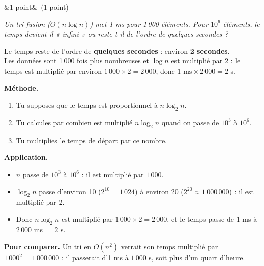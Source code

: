 \documentclass[11pt, a4paper]{exam}
\newcommand{\Q}[3]{\par\needspace{5\baselineskip}\bigskip\noindent{\large\bfseries Question #1}\ifx&#2&\else\ \textnormal{(#2)}\fi\par\nopagebreak\smallskip\noindent\textit{#3}\par\nopagebreak\smallskip}
\newcommand{\methode}{\par\noindent\textbf{Méthode.}\ }
\newcommand{\application}{\par\noindent\textbf{Application.}\ }
\begin{document}
\Q{1 (b)}{1 point}{Un tri fusion ($O(n \log n)$) met 1 ms pour 1\,000 éléments. Pour $10^6$ éléments, le temps devient-il « infini » ou reste-t-il de l'ordre de quelques secondes ?}
\begin{reponse}
Le temps reste de l'ordre de \textbf{quelques secondes} : environ \textbf{2 secondes}. \\
Les données sont 1\,000 fois plus nombreuses et $\log n$ est multiplié par 2 : le temps est multiplié par environ $1\,000 \times 2 = 2\,000$, donc $1 \text{ ms} \times 2\,000 = 2$ s.
\end{reponse}
\methode
\begin{enumerate}
\item Tu supposes que le temps est proportionnel à $n \log_2 n$.
\item Tu calcules par combien est multiplié $n \log_2 n$ quand on passe de $10^3$ à $10^6$.
\item Tu multiplies le temps de départ par ce nombre.
\end{enumerate}
\application
\begin{itemize}
\item $n$ passe de $10^3$ à $10^6$ : il est multiplié par $1\,000$.
\item $\log_2 n$ passe d'environ 10 ($2^{10} = 1\,024$) à environ 20 ($2^{20} \approx 1\,000\,000$) : il est multiplié par 2.
\item Donc $n \log_2 n$ est multiplié par $1\,000 \times 2 = 2\,000$, et le temps passe de 1 ms à $2\,000$ ms $= 2$ s.
\end{itemize}
\textbf{Pour comparer.} Un tri en $O(n^2)$ verrait son temps multiplié par $1\,000^2 = 1\,000\,000$ : il passerait d'1 ms à $1\,000$ s, soit plus d'un quart d'heure.
\end{document}
